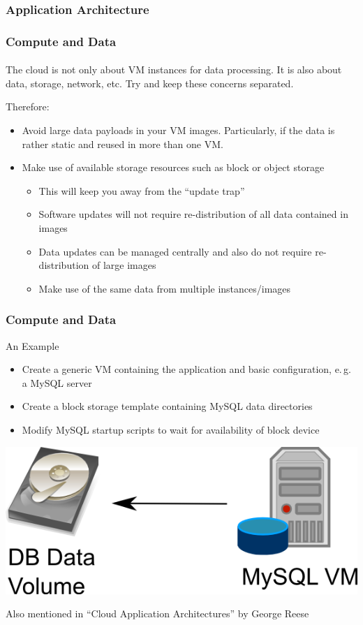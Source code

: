 
\begin{frame}
\frametitle{Application Architecture}
\framesubtitle{}

\end{frame}


\begin{frame}
\frametitle{Compute and Data}
\framesubtitle{}
The cloud is not only about VM instances for data processing. It is
also about data, storage, network, etc. Try and keep these concerns
separated.

Therefore:
\begin{itemize}
\item Avoid large data payloads in your VM images. Particularly, if
  the data is rather static and reused in more than one VM.
\item Make use of available storage resources such as block or object
  storage
  \begin{itemize}
  \item This will keep you away from the ``update trap''
  \item Software updates will not require re-distribution of all data
    contained in images
  \item Data updates can be managed centrally and also do not require
    re-distribution of large images
  \item Make use of the same data from multiple instances/images
  \end{itemize}
\end{itemize}
\end{frame}

\begin{frame}
\frametitle{Compute and Data}
An Example
\begin{itemize}
\item Create a generic VM containing the application and basic
  configuration, e.\,g. a MySQL server
\item Create a block storage template containing MySQL data directories
\item Modify MySQL startup scripts to wait for availability of block device
\end{itemize}

\includegraphics[width=.4\textwidth]{images/DBaaS.png}

\tiny Also mentioned in ``Cloud Application Architectures'' by George Reese
\end{frame}

